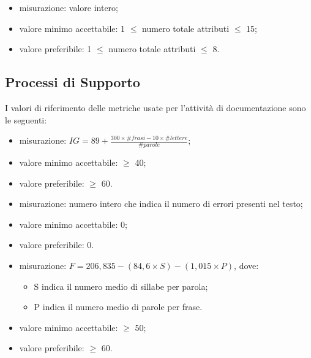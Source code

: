 			\begin{itemize}
				\item{misurazione: valore intero;}
				\item{valore minimo accettabile: 1 $\leq$ numero totale attributi $\leq$ 15;}
				\item{valore preferibile: 1 $\leq$ numero totale attributi $\leq$ 8.}
			\end{itemize}

\subsection{Processi di Supporto}

	I valori di riferimento delle metriche usate per l'attività di documentazione sono le seguenti:
	
			 \begin{itemize}
				\item{misurazione: $ IG=89+\frac{300 \times \#frasi -10\times \#lettere}{\#parole} $;}
				\item{valore minimo accettabile: $\geq$ 40;}
				\item{valore preferibile: $\geq$ 60.}
			\end{itemize}

			\begin{itemize}
				\item{misurazione: numero intero che indica il numero di errori presenti nel testo;}
				\item{valore minimo accettabile: 0;}
				\item{valore preferibile: 0.}
			\end{itemize}
		
			 \begin{itemize}
				\item{misurazione: $ F = 206,835 - (84,6 \times S) - (1,015 \times P) $, dove: 
				\begin{itemize}
					\item S indica il numero medio di sillabe per parola; 
					\item P indica il numero medio di parole per frase. 
				\end{itemize}}
				\item{valore minimo accettabile: $\geq$ 50;}
				\item{valore preferibile: $\geq$ 60.}
			\end{itemize}

